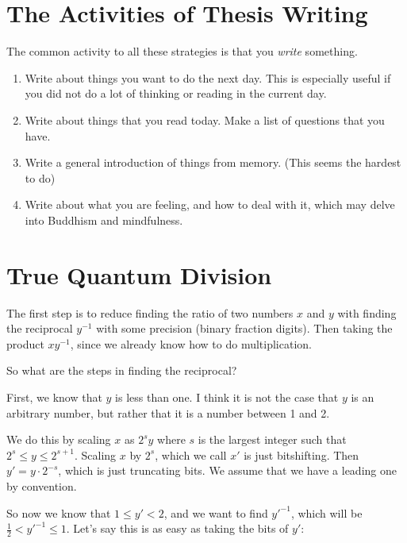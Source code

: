 \documentclass{article}
\begin{document}
\section{The Activities of Thesis Writing}

The common activity to all these strategies is that you \emph{write} 
something.

\begin{enumerate}

\item Write about things you want to do the next day. This is especially
useful if you did not do a lot of thinking or reading in the current day.

\item Write about things that you read today. Make a list of questions
that you have.

\item Write a general introduction of things from memory. (This seems the
hardest to do)

\item Write about what you are feeling, and how to deal with it, which
may delve into Buddhism and mindfulness.

\end{enumerate}

\section{True Quantum Division}

The first step is to reduce finding the ratio of two numbers $x$ and $y$
with finding the reciprocal $y^{-1}$ with some precision (binary fraction 
digits). Then taking the product $x y^{-1}$, since we already know how to
do multiplication.

So what are the steps in finding the reciprocal?

First, we know that $y$ is less than one. I think it is not the case that
$y$ is an arbitrary number, but rather that it is a number between 1 and 2.

We do this by scaling $x$ as $2^s y$ where $s$ is the largest integer such
that $2^s \le y \le 2^{s+1}$. Scaling $x$ by $2^s$, which we call $x'$ is
just bitshifting. Then $y' = y \cdot 2^{-s}$, which is just truncating bits.
We assume that we have a leading one by convention.

So now we know that $1 \le y' < 2$, and we want to find $y'^{-1}$, which
will be $\frac{1}{2} < y'^{-1} \le 1$. Let's say this is as easy as
taking the bits of $y'$:
\end{document}
